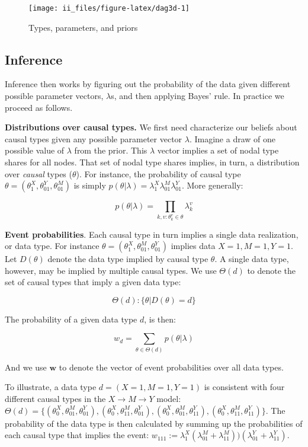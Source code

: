 \documentclass[
  12pt,
]{book}
\begin{document}
\begin{figure}

{\centering \texttt{[image: ii\_files/figure-latex/dag3d-1]} 

}

\caption{Types, parameters, and priors}\label{fig:dag3d}
\end{figure}

\hypertarget{inference}{%
\subsection{Inference}\label{inference}}

Inference then works by figuring out the probability of the data given different possible parameter vectors, \(\lambda\)s, and then applying Bayes' rule. In practice we proceed as follows.

\textbf{Distributions over causal types.} We first need characterize our beliefs about causal types given any possible parameter vector \(\lambda\). Imagine a draw of one possible value of \(\lambda\) from the prior. This \(\lambda\) vector implies a set of nodal type shares for all nodes. That set of nodal type shares implies, in turn, a distribution over \emph{causal} types (\(\theta\)). For instance, the probability of causal type \(\theta = (\theta^X_1, \theta^Y_{01}, \theta^M_{01})\) is simply \(p(\theta|\lambda)=\lambda^X_1\lambda^M_{01}\lambda^Y_{01}\). More generally:

\[p(\theta|\lambda) = \prod_{k,v:\theta^v_k\in\theta}\lambda^v_k\]

\textbf{Event probabilities}. Each causal type in turn implies a single data realization, or data type. For instance \(\theta = (\theta^X_1, \theta^M_{01}, \theta^Y_{01})\) implies data \(X=1, M=1, Y=1\). Let \(D(\theta)\) denote the data type implied by causal type \(\theta\). A single data type, however, may be implied by multiple causal types. We use \(\Theta(d)\) to denote the set of causal types that imply a given data type:

\[\Theta(d) : \{\theta| D(\theta) = d \}\]

The probability of a given data type \(d\), is then:

\[w_d = \sum_{\theta \in \Theta(d)}p(\theta|\lambda)\]

And we use \(\mathbf w\) to denote the vector of event probabilities over all data types.

To illustrate, a data type \(d = (X=1, M =1, Y=1)\) is consistent with four different causal types in the \(X\rightarrow M\rightarrow Y\) model: \(\Theta(d) = \{(\theta^X_0, \theta^M_{01}, \theta^Y_{01}), (\theta^X_0, \theta^M_{11}, \theta^Y_{01}), (\theta^X_0, \theta^M_{01}, \theta^Y_{11}), (\theta^X_0, \theta^M_{11}, \theta^Y_{11})\}\). The probability of the data type is then calculated by summing up the probabilities of each causal type that implies the event: \(w_{111}:=\lambda^X_1(\lambda^M_{01} + \lambda^M_{11}))(\lambda^Y_{01} + \lambda^Y_{11})\).
\end{document}
